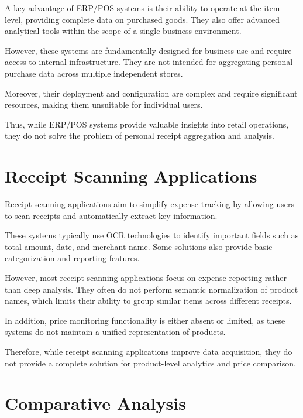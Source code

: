 A key advantage of ERP/POS systems is their ability to operate at the item level, providing complete data on purchased goods. They also offer advanced analytical tools within the scope of a single business environment.

However, these systems are fundamentally designed for business use and require access to internal infrastructure. They are not intended for aggregating personal purchase data across multiple independent stores.

Moreover, their deployment and configuration are complex and require significant resources, making them unsuitable for individual users.

Thus, while ERP/POS systems provide valuable insights into retail operations, they do not solve the problem of personal receipt aggregation and analysis.

\section{Receipt Scanning Applications}

Receipt scanning applications aim to simplify expense tracking by allowing users to scan receipts and automatically extract key information.

These systems typically use OCR technologies to identify important fields such as total amount, date, and merchant name. Some solutions also provide basic categorization and reporting features.

However, most receipt scanning applications focus on expense reporting rather than deep analysis. They often do not perform semantic normalization of product names, which limits their ability to group similar items across different receipts.

In addition, price monitoring functionality is either absent or limited, as these systems do not maintain a unified representation of products.

Therefore, while receipt scanning applications improve data acquisition, they do not provide a complete solution for product-level analytics and price comparison.

\section{Comparative Analysis}

